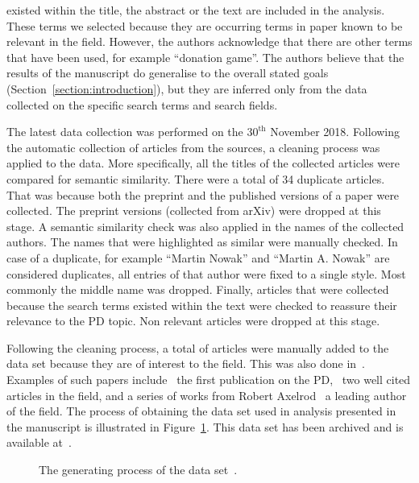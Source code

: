 \documentclass{article}
\theoremstyle{definition}
\newcommand{\manual}{}
\begin{document}
existed within the title, the abstract or the text are included in the analysis.
These terms we selected because they are occurring terms in paper known to be
relevant in the field. However, the authors acknowledge that there are other
terms that have been used, for example ``donation game''. The authors believe
that the results of the manuscript do generalise to the overall stated goals
(Section~\ref{section:introduction}), but they are inferred only from
the data collected on the specific search terms and search fields.

The latest data collection was performed on the \(30^{\text{th}}\) November
2018. Following the automatic collection of articles from the sources, a
cleaning process was applied to the data. More specifically, all the titles of
the collected articles were compared for semantic similarity. There were a total
of 34 duplicate articles. That was because both the preprint and the published
versions of a paper were collected. The preprint versions
(collected from arXiv) were dropped at this stage. A semantic similarity check
was also applied in the names of the collected authors. The names that were
highlighted as similar were manually checked. In case of a duplicate, for
example ``Martin Nowak'' and ``Martin A. Nowak'' are considered duplicates, all
entries of that author were fixed to a single style. Most commonly the middle
name was dropped. Finally, articles that were collected because the search terms
existed within the text were checked to reassure their relevance to the PD
topic. Non relevant articles were dropped at this stage. 

Following the cleaning process, a total of \manual articles were manually added
to the data set because they are of interest to the field. This was also done
in~\cite{Liu2015}. Examples of such papers include~\cite{Flood1958} the first publication on the
PD,~\cite{Ohtsuki2006, Stewart2012} two well cited articles in the field, and a
series of works from Robert Axelrod~\cite{Axelrod1980, Axelrod1980more,
Axelrod1987, Axelrod1981, Riolo2001} a leading author of the field.
The process of obtaining the data set used in analysis presented in the
manuscript is illustrated in Figure~\ref{figure:colection_process}.
This data set has been archived and is available at~\cite{pd_data_2018}.

\begin{figure}[!hbtp]
    \begin{center}
        
    \end{center}
    \caption{The generating process of the data set~\cite{pd_data_2018}.}\label{figure:colection_process}
\end{figure}
\end{document}
